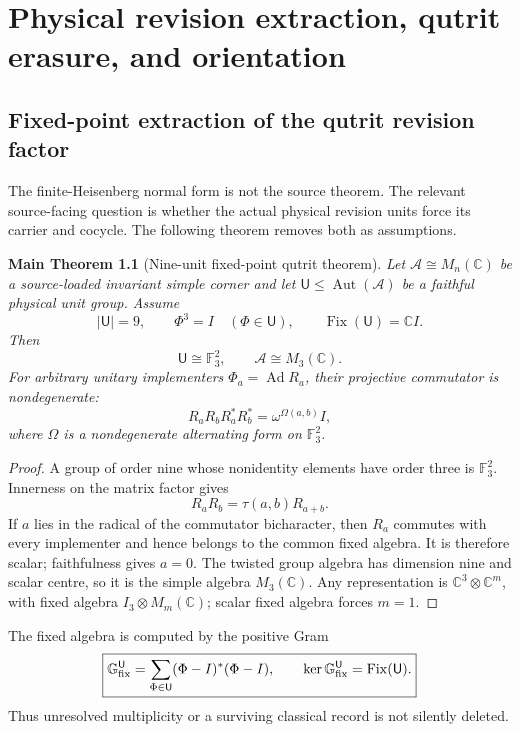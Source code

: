 \documentclass[11pt,oneside,openany]{book}
\numberwithin{equation}{chapter}
\newtheorem{maintheorem}[theorem]{Main Theorem}
\theoremstyle{definition}
\theoremstyle{remark}
\newcommand{\C}{\mathbb C}
\newcommand{\Aut}{\operatorname{Aut}}
\newcommand{\Ad}{\operatorname{Ad}}
\newcommand{\Fthree}{\mathbb F_3}
\newcommand{\Fix}{\operatorname{Fix}}
\begin{document}
\chapter{Physical revision extraction, qutrit erasure, and orientation}
\label{ch:v6-revision-screen}

\section{Fixed-point extraction of the qutrit revision factor}
The finite-Heisenberg normal form is not the source theorem.  The relevant
source-facing question is whether the actual physical revision units force its
carrier and cocycle.  The following theorem removes both as assumptions.

\begin{maintheorem}[Nine-unit fixed-point qutrit theorem]
\label{thm:v6-fixed-qutrit}
Let \(\mathcal A\cong M_n(\C)\) be a source-loaded invariant simple corner and
let \(\mathsf U\le\Aut(\mathcal A)\) be a faithful physical unit group.  Assume
\[
 |\mathsf U|=9,
 \qquad \Phi^3=I\quad(\Phi\in\mathsf U),
 \qquad \Fix(\mathsf U)=\C I.
\]
Then
\[
 \boxed{\mathsf U\cong\Fthree^2,
        \qquad \mathcal A\cong M_3(\C).}
\]
For arbitrary unitary implementers \(\Phi_a=\Ad R_a\), their projective
commutator is nondegenerate:
\[
 \boxed{R_aR_bR_a^*R_b^*=\omega^{\Omega(a,b)}I,}
\]
where \(\Omega\) is a nondegenerate alternating form on \(\Fthree^2\).
\end{maintheorem}

\begin{proof}
A group of order nine whose nonidentity elements have order three is
\(\Fthree^2\).  Innerness on the matrix factor gives
\[
 R_aR_b=\tau(a,b)R_{a+b}.
\]
If \(a\) lies in the radical of the commutator bicharacter, then \(R_a\) commutes
with every implementer and hence belongs to the common fixed algebra.  It is
therefore scalar; faithfulness gives \(a=0\).  The twisted group algebra has
dimension nine and scalar centre, so it is the simple algebra \(M_3(\C)\).  Any
representation is \(\C^3\otimes\C^m\), with fixed algebra
\(I_3\otimes M_m(\C)\); scalar fixed algebra forces \(m=1\).
\end{proof}

The fixed algebra is computed by the positive Gram
\[
 \boxed{\mathbb G_{\rm fix}^{\mathsf U}
 =\sum_{\Phi\in\mathsf U}(\Phi-I)^*(\Phi-I),
 \qquad \ker\mathbb G_{\rm fix}^{\mathsf U}=\Fix(\mathsf U).}
\]
Thus unresolved multiplicity or a surviving classical record is not silently
deleted.
\end{document}
